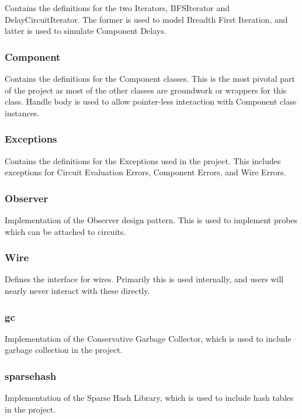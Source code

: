 \documentclass{article}
\begin{document}
Contains the definitions for the two Iterators, BFSIterator and DelayCircuitIterator. The former is used to model Breadth First Iteration, and latter is used to simulate Component Delays.

\subsubsection{Component}

Contains the definitions for the Component classes. This is the most pivotal part of the project as most of the other classes are groundwork or wrappers for this class. Handle body is used to allow pointer-less interaction with Component class instances.

\subsubsection{Exceptions}

Contains the definitions for the Exceptions used in the project. This includes exceptions for Circuit Evaluation Errors, Component Errors, and Wire Errors.

\subsubsection{Observer}

Implementation of the Observer design pattern. This is used to implement probes which can be attached to circuits.

\subsubsection{Wire}

Defines the interface for wires. Primarily this is used internally, and users will nearly never interact with these directly.

\subsubsection{gc}

Implementation of the Conservative Garbage Collector, which is used to include garbage collection in the project.

\subsubsection{sparsehash}

Implementation of the Sparse Hash Library, which is used to include hash tables in the project.
\end{document}
